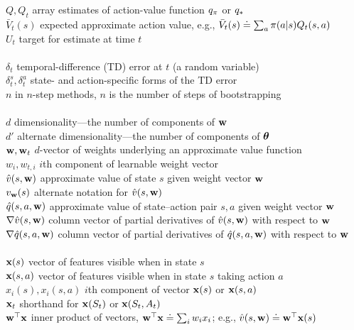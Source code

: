 \documentclass[10pt,fleqn]{article}
\begin{document}
\begin{tabbing}
\>$Q, Q_t$            \> array estimates of action-value function $q_\pi$ or $q_*$\\
\>$\bar V_t(s)$       \> expected approximate action value, e.g., $\bar V_t(s)\doteq\sum_a\pi(a|s)Q_{t}(s,a)$\\
\>$U_t$               \> target for estimate at time $t$\\
\\
\>$\delta_t$          \> temporal-difference (TD) error at $t$ (a random variable) \\
\>$\delta^s_t, \delta^a_t$ \> state- and action-specific forms of the TD error \\
\>$n$                 \> in $n$-step methods, $n$ is the number of steps of bootstrapping\\
\\
\>$d$                 \> dimensionality---the number of components of ${\bf w}$\\
\>$d'$                \> alternate dimensionality---the number of components of ${\bm\theta}$\\
\>${\bf w},{\bf w}_t$           \> $d$-vector of weights underlying an approximate value function\\
\>$w_i,w_{t,i}$ \> $i$th component of learnable weight vector\\
\>$\hat v(s,{\bf w})$      \> approximate value of state $s$ given weight vector ${\bf w}$\\
\>$v_{\bf w}(s)$           \> alternate notation for $\hat v(s,{\bf w})$\\
\>$\hat q(s,a,{\bf w})$    \> approximate value of state--action pair $s,a$ given weight vector ${\bf w}$\\
\>$\nabla \hat v(s,{\bf w})$\> column vector of partial derivatives of $\hat v(s,{\bf w})$ with respect to ${\bf w}$\\
\>$\nabla \hat q(s,a,{\bf w})$\> column vector of partial derivatives of $\hat q(s,a,{\bf w})$ with respect to ${\bf w}$\\
\\
\>${\bf x}(s)$             \> vector of features visible when in state $s$\\
\>${\bf x}(s,a)$           \> vector of features visible when in state $s$ taking action $a$\\
\>$x_i(s), x_i(s,a)$  \> $i$th component of vector ${\bf x}(s)$ or ${\bf x}(s, a)$\\
\>${\bf x}_t$              \> shorthand for ${\bf x}(S_t)$ or ${\bf x}(S_t,A_t)$\\
\>${\bf w}^\top{\bf x}$           \> inner product of vectors, ${\bf w}^\top{\bf x}\doteq\sum_i w_i x_i$; e.g., $\hat v(s,{\bf w})\doteq{\bf w}^\top{\bf x}(s)$\\

\end{tabbing}
\end{document}
